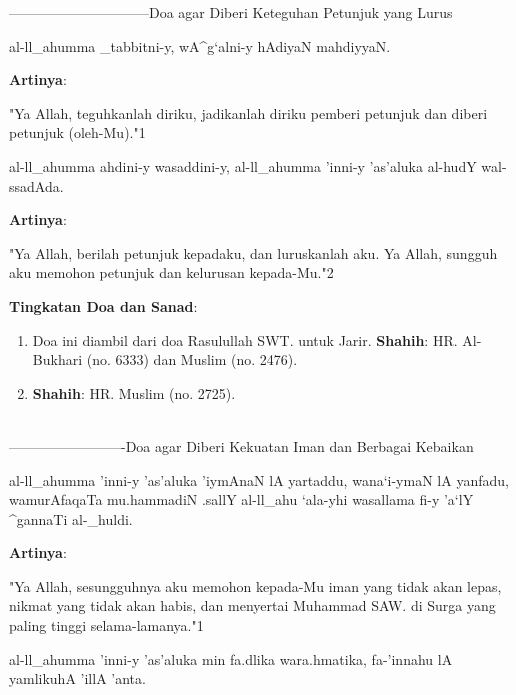 \documentclass[a4paper,12pt]{article}
\begin{document}
\par
{}------------------------------Doa agar Diberi Keteguhan Petunjuk yang Lurus
\begin{arabtext}
\noindent
al-ll_ahumma _tabbitni-y, wA^g`alni-y hAdiyaN mahdiyyaN.\\
\end{arabtext}
\noindent
\textbf{Artinya}:
\par
\indent
"Ya Allah, teguhkanlah diriku, jadikanlah diriku pemberi petunjuk dan 
diberi petunjuk (oleh-Mu)."{\scriptsize 1}\\
\begin{arabtext}
\noindent
al-ll_ahumma ahdini-y wasaddini-y, al-ll_ahumma 'inni-y 'as'aluka al-hudY 
wal-ssadAda.\\
\end{arabtext}
\noindent
\textbf{Artinya}:
\par
\indent
"Ya Allah, berilah petunjuk kepadaku, dan luruskanlah aku. Ya Allah, 
sungguh aku memohon petunjuk dan kelurusan kepada-Mu."{\scriptsize 2}\\
\par
\noindent
\textbf{Tingkatan Doa dan Sanad}:
\begin{enumerate}
\item Doa ini diambil dari doa Rasulullah SWT. untuk Jarir. 
\textbf{Shahih}: HR. Al-Bukhari (no. 6333) dan Muslim (no. 2476).
\item \textbf{Shahih}: HR. Muslim (no. 2725).\\\\
\end{enumerate}
\par
{}-------------------------Doa agar Diberi Kekuatan Iman dan Berbagai Kebaikan
\begin{arabtext}
\noindent
al-ll_ahumma 'inni-y 'as'aluka 'iymAnaN lA yartaddu, wana`i-ymaN lA 
yanfadu, wamurAfaqaTa mu.hammadiN .sallY al-ll_ahu `ala-yhi wasallama fi-y 
'a`lY ^gannaTi al-_huldi.\\
\end{arabtext}
\noindent
\textbf{Artinya}:
\par
\indent
"Ya Allah, sesungguhnya aku memohon kepada-Mu iman yang tidak akan lepas, 
nikmat yang tidak akan habis, dan menyertai Muhammad SAW. di Surga yang 
paling tinggi selama-lamanya."{\scriptsize 1}\\
\begin{arabtext}
\noindent
al-ll_ahumma 'inni-y 'as'aluka min fa.dlika wara.hmatika, fa-'innahu lA 
yamlikuhA 'illA 'anta.\\
\end{arabtext}
\end{document}

